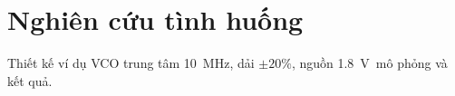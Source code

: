 \chapter{Nghiên cứu tình huống}
Thiết kế ví dụ VCO trung tâm \SI{10}{\mega\hertz}, dải \(\pm20\%\), nguồn \SI{1.8}{\volt}\, mô phỏng và kết quả.


